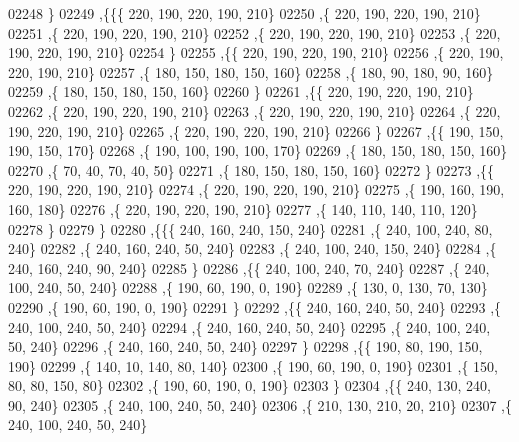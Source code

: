 \begin{DoxyCode}
02248    \}
02249   ,\{\{\{   220,   190,   220,   190,   210\}
02250     ,\{   220,   190,   220,   190,   210\}
02251     ,\{   220,   190,   220,   190,   210\}
02252     ,\{   220,   190,   220,   190,   210\}
02253     ,\{   220,   190,   220,   190,   210\}
02254     \}
02255    ,\{\{   220,   190,   220,   190,   210\}
02256     ,\{   220,   190,   220,   190,   210\}
02257     ,\{   180,   150,   180,   150,   160\}
02258     ,\{   180,    90,   180,    90,   160\}
02259     ,\{   180,   150,   180,   150,   160\}
02260     \}
02261    ,\{\{   220,   190,   220,   190,   210\}
02262     ,\{   220,   190,   220,   190,   210\}
02263     ,\{   220,   190,   220,   190,   210\}
02264     ,\{   220,   190,   220,   190,   210\}
02265     ,\{   220,   190,   220,   190,   210\}
02266     \}
02267    ,\{\{   190,   150,   190,   150,   170\}
02268     ,\{   190,   100,   190,   100,   170\}
02269     ,\{   180,   150,   180,   150,   160\}
02270     ,\{    70,    40,    70,    40,    50\}
02271     ,\{   180,   150,   180,   150,   160\}
02272     \}
02273    ,\{\{   220,   190,   220,   190,   210\}
02274     ,\{   220,   190,   220,   190,   210\}
02275     ,\{   190,   160,   190,   160,   180\}
02276     ,\{   220,   190,   220,   190,   210\}
02277     ,\{   140,   110,   140,   110,   120\}
02278     \}
02279    \}
02280   ,\{\{\{   240,   160,   240,   150,   240\}
02281     ,\{   240,   100,   240,    80,   240\}
02282     ,\{   240,   160,   240,    50,   240\}
02283     ,\{   240,   100,   240,   150,   240\}
02284     ,\{   240,   160,   240,    90,   240\}
02285     \}
02286    ,\{\{   240,   100,   240,    70,   240\}
02287     ,\{   240,   100,   240,    50,   240\}
02288     ,\{   190,    60,   190,     0,   190\}
02289     ,\{   130,     0,   130,    70,   130\}
02290     ,\{   190,    60,   190,     0,   190\}
02291     \}
02292    ,\{\{   240,   160,   240,    50,   240\}
02293     ,\{   240,   100,   240,    50,   240\}
02294     ,\{   240,   160,   240,    50,   240\}
02295     ,\{   240,   100,   240,    50,   240\}
02296     ,\{   240,   160,   240,    50,   240\}
02297     \}
02298    ,\{\{   190,    80,   190,   150,   190\}
02299     ,\{   140,    10,   140,    80,   140\}
02300     ,\{   190,    60,   190,     0,   190\}
02301     ,\{   150,    80,    80,   150,    80\}
02302     ,\{   190,    60,   190,     0,   190\}
02303     \}
02304    ,\{\{   240,   130,   240,    90,   240\}
02305     ,\{   240,   100,   240,    50,   240\}
02306     ,\{   210,   130,   210,    20,   210\}
02307     ,\{   240,   100,   240,    50,   240\}

\end{DoxyCode}
